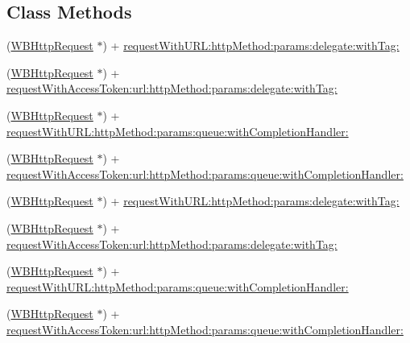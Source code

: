 \subsection*{Class Methods}
\begin{DoxyCompactItemize}
\item 
(\mbox{\hyperlink{interface_w_b_http_request}{W\+B\+Http\+Request}} $\ast$) + \mbox{\hyperlink{interface_w_b_http_request_a9deb407d01b6907f530279cecaa06f98}{request\+With\+U\+R\+L\+:http\+Method\+:params\+:delegate\+:with\+Tag\+:}}
\item 
(\mbox{\hyperlink{interface_w_b_http_request}{W\+B\+Http\+Request}} $\ast$) + \mbox{\hyperlink{interface_w_b_http_request_a287736c75767a8e2c0ca578a53e4e305}{request\+With\+Access\+Token\+:url\+:http\+Method\+:params\+:delegate\+:with\+Tag\+:}}
\item 
(\mbox{\hyperlink{interface_w_b_http_request}{W\+B\+Http\+Request}} $\ast$) + \mbox{\hyperlink{interface_w_b_http_request_a6cb01a6097164bb37dc91517c1609a6e}{request\+With\+U\+R\+L\+:http\+Method\+:params\+:queue\+:with\+Completion\+Handler\+:}}
\item 
(\mbox{\hyperlink{interface_w_b_http_request}{W\+B\+Http\+Request}} $\ast$) + \mbox{\hyperlink{interface_w_b_http_request_a9c704ca2a1f1c6e372b4695295bb7bc2}{request\+With\+Access\+Token\+:url\+:http\+Method\+:params\+:queue\+:with\+Completion\+Handler\+:}}
\item 
(\mbox{\hyperlink{interface_w_b_http_request}{W\+B\+Http\+Request}} $\ast$) + \mbox{\hyperlink{interface_w_b_http_request_a9deb407d01b6907f530279cecaa06f98}{request\+With\+U\+R\+L\+:http\+Method\+:params\+:delegate\+:with\+Tag\+:}}
\item 
(\mbox{\hyperlink{interface_w_b_http_request}{W\+B\+Http\+Request}} $\ast$) + \mbox{\hyperlink{interface_w_b_http_request_a287736c75767a8e2c0ca578a53e4e305}{request\+With\+Access\+Token\+:url\+:http\+Method\+:params\+:delegate\+:with\+Tag\+:}}
\item 
(\mbox{\hyperlink{interface_w_b_http_request}{W\+B\+Http\+Request}} $\ast$) + \mbox{\hyperlink{interface_w_b_http_request_a6cb01a6097164bb37dc91517c1609a6e}{request\+With\+U\+R\+L\+:http\+Method\+:params\+:queue\+:with\+Completion\+Handler\+:}}
\item 
(\mbox{\hyperlink{interface_w_b_http_request}{W\+B\+Http\+Request}} $\ast$) + \mbox{\hyperlink{interface_w_b_http_request_a9c704ca2a1f1c6e372b4695295bb7bc2}{request\+With\+Access\+Token\+:url\+:http\+Method\+:params\+:queue\+:with\+Completion\+Handler\+:}}
\item 

\end{DoxyCompactItemize}
